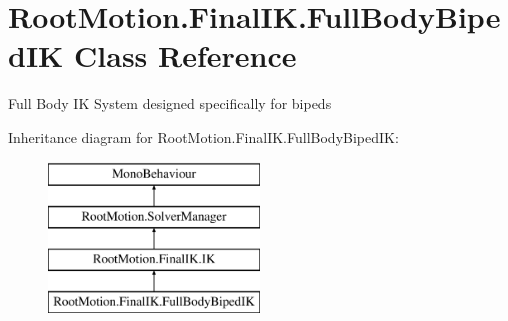 \hypertarget{class_root_motion_1_1_final_i_k_1_1_full_body_biped_i_k}{}\section{Root\+Motion.\+Final\+I\+K.\+Full\+Body\+Biped\+IK Class Reference}
\label{class_root_motion_1_1_final_i_k_1_1_full_body_biped_i_k}


Full Body IK System designed specifically for bipeds  


Inheritance diagram for Root\+Motion.\+Final\+I\+K.\+Full\+Body\+Biped\+IK\+:\begin{figure}[H]
\begin{center}
\leavevmode
\includegraphics[height=4.000000cm]{class_root_motion_1_1_final_i_k_1_1_full_body_biped_i_k}
\end{center}
\end{figure}

